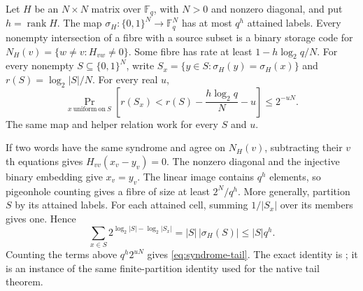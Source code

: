 \begin{proposition}\label{prop:syndrome}
Let $H$ be an $N\times N$ matrix over $\mathbb F_q$, with $N>0$ and
nonzero diagonal, and put $h=\operatorname{rank}H$.
The map $\sigma_H:\{0,1\}^N\to\mathbb F_q^N$ has at most $q^h$
attained labels. Every nonempty intersection of a fibre with a source
subset is a binary storage code for
$N_H(v)=\{w\ne v:H_{vw}\ne0\}$.
Some fibre has rate at least $1-h\log_2q/N$.
For every nonempty $S\subseteq\{0,1\}^N$, write
$S_x=\{y\in S:\sigma_H(y)=\sigma_H(x)\}$ and
$r(S)=\log_2|S|/N$. For every real $u$,
\begin{equation}\label{eq:syndrome-tail}
 \Pr_{x\ \mathrm{uniform\ on}\ S}
 \left[r(S_x)<r(S)-\frac{h\log_2q}{N}-u\right]
 \le 2^{-uN}.
\end{equation}
The same map and helper relation work for every $S$ and $u$.
\end{proposition}
\begin{outline}
If two words have the same syndrome and agree on $N_H(v)$, subtracting
their $v$th equations gives $H_{vv}(x_v-y_v)=0$. The nonzero diagonal
and the injective binary embedding give $x_v=y_v$.
The linear image contains $q^h$ elements, so pigeonhole counting gives
a fibre of size at least $2^N/q^h$. More generally, partition $S$ by its
attained labels. For each attained cell, summing $1/|S_x|$ over its
members gives one. Hence
\[
 \sum_{x\in S}2^{\log_2|S|-\log_2|S_x|}
     =|S|\,|\sigma_H(S)|\le |S|q^h.
\]
Counting the terms above $q^h2^{uN}$ gives
\cref{eq:syndrome-tail}. The exact identity is
; it is an instance
of the same finite-partition identity used for the native tail theorem.
\end{outline}

